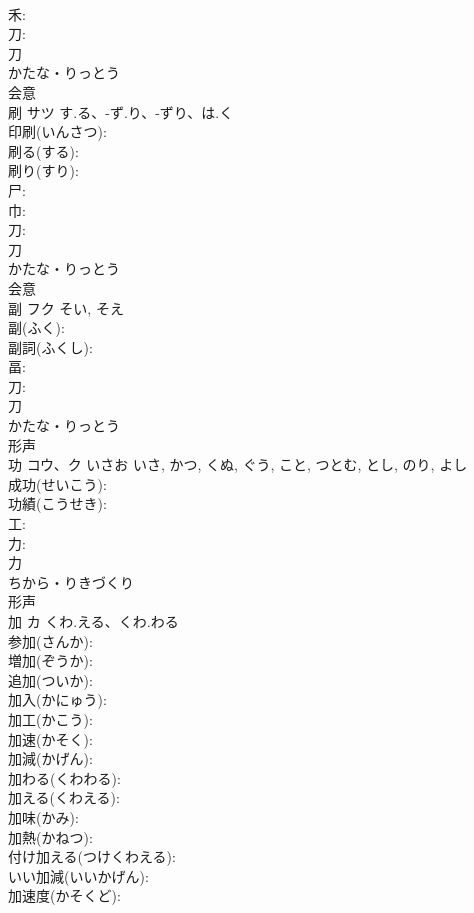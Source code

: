 \documentclass[8pt]{extreport}
\begin{document}
\begin{CJK}{UTF8}{min}
\\	禾: 
\\	刀: 
\\	刀	
\\	かたな・りっとう	
\\	会意 
\\	刷	サツ	す.る、-ず.り、-ずり、は.く		
\\	印刷(いんさつ): 
\\	刷る(する): 
\\	刷り(すり): 
\\	尸: 
\\	巾: 
\\	刀: 
\\	刀	
\\	かたな・りっとう	
\\	会意 
\\	副	フク		そい, そえ	
\\	副(ふく): 
\\	副詞(ふくし): 
\\	畐: 
\\	刀: 
\\	刀	
\\	かたな・りっとう	
\\	形声 
\\	功	コウ、ク	いさお	いさ, かつ, くぬ, ぐう, こと, つとむ, とし, のり, よし	
\\	成功(せいこう): 
\\	功績(こうせき): 
\\	工: 
\\	力: 
\\	力	
\\	ちから・りきづくり	
\\	形声 
\\	加	カ	くわ.える、くわ.わる		
\\	参加(さんか): 
\\	増加(ぞうか): 
\\	追加(ついか): 
\\	加入(かにゅう): 
\\	加工(かこう): 
\\	加速(かそく): 
\\	加減(かげん): 
\\	加わる(くわわる): 
\\	加える(くわえる): 
\\	加味(かみ): 
\\	加熱(かねつ): 
\\	付け加える(つけくわえる): 
\\	いい加減(いいかげん): 
\\	加速度(かそくど): 

\end{CJK}
\end{document}
